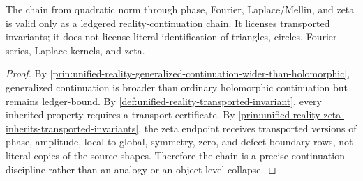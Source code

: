 \begin{theorem}
\label{thm:unified-reality-generalized-continuation-chain-boundary-principle}
The chain from quadratic norm through phase, Fourier, Laplace/Mellin,
and zeta is valid only as a ledgered reality-continuation chain. It
licenses transported invariants; it does not license literal
identification of triangles, circles, Fourier series, Laplace kernels,
and zeta.
\end{theorem}

\begin{proof}
By
\autoref{prin:unified-reality-generalized-continuation-wider-than-holomorphic},
generalized continuation is broader than ordinary holomorphic
continuation but remains ledger-bound. By
\autoref{def:unified-reality-transported-invariant}, every inherited
property requires a transport certificate. By
\autoref{prin:unified-reality-zeta-inherits-transported-invariants}, the
zeta endpoint receives transported versions of phase, amplitude,
local-to-global, symmetry, zero, and defect-boundary rows, not literal
copies of the source shapes. Therefore the chain is a precise
continuation discipline rather than an analogy or an object-level
collapse.
\end{proof}
